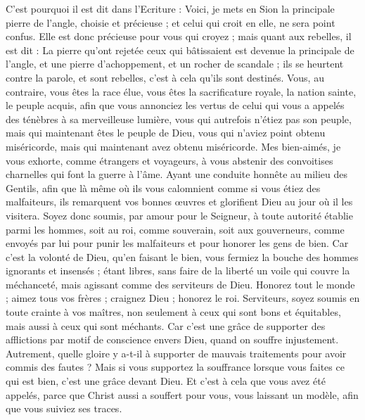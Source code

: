 \begin{multicols}{2}
C'est pourquoi il est dit dans l'Ecriture : Voici, je mets en Sion la principale pierre de l'angle, choisie et précieuse ; et celui qui croit en elle, ne sera point confus.
Elle est donc précieuse pour vous qui croyez ; mais quant aux rebelles, il est dit : La pierre qu'ont rejetée ceux qui bâtissaient est devenue la principale de l'angle, 
et une pierre d'achoppement, et un rocher de scandale ; ils se heurtent contre la parole, et sont rebelles, c'est à cela qu'ils sont destinés.
Vous, au contraire, vous êtes la race élue, vous êtes la sacrificature royale, la nation sainte, le peuple acquis, afin que vous annonciez les vertus de celui qui vous a appelés des ténèbres à sa merveilleuse lumière,
vous qui autrefois n'étiez pas son peuple, mais qui maintenant êtes le peuple de Dieu, vous qui n'aviez point obtenu miséricorde, mais qui maintenant avez obtenu miséricorde.
Mes bien-aimés, je vous exhorte, comme étrangers et voyageurs, à vous abstenir des convoitises charnelles qui font la guerre à l'âme.
Ayant une conduite honnête au milieu des Gentils, afin que là même où ils vous calomnient comme si vous étiez des malfaiteurs, ils remarquent vos bonnes œuvres et glorifient Dieu au jour où il les visitera.
Soyez donc soumis, par amour pour le Seigneur, à toute autorité établie parmi les hommes, soit au roi, comme souverain,
soit aux gouverneurs, comme envoyés par lui pour punir les malfaiteurs et pour honorer les gens de bien.
Car c'est la volonté de Dieu, qu'en faisant le bien, vous fermiez la bouche des hommes ignorants et insensés ;
étant libres, sans faire de la liberté un voile qui couvre la méchanceté, mais agissant comme des serviteurs de Dieu.
Honorez tout le monde ; aimez tous vos frères ; craignez Dieu ; honorez le roi.
Serviteurs, soyez soumis en toute crainte à vos maîtres, non seulement à ceux qui sont bons et équitables, mais aussi à ceux qui sont méchants.
Car c'est une grâce de supporter des afflictions par motif de conscience envers Dieu, quand on souffre injustement.
Autrement, quelle gloire y a-t-il à supporter de mauvais traitements pour avoir commis des fautes ? Mais si vous supportez la souffrance lorsque vous faites ce qui est bien, c'est une grâce devant Dieu.
Et c'est à cela que vous avez été appelés, parce que Christ aussi a souffert pour vous, vous laissant un modèle, afin que vous suiviez ses traces.

\end{multicols}
